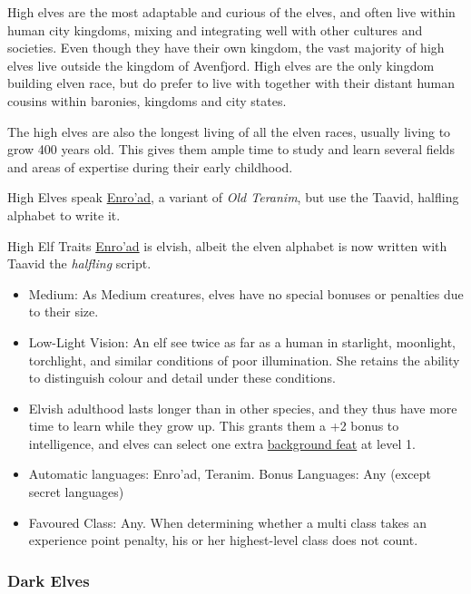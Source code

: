 High elves are the most adaptable and curious of the elves, and often live
within human city kingdoms, mixing and integrating well with other cultures
and societies. Even though they have their own kingdom, the vast majority of
high elves live outside the kingdom of Avenfjord. High elves are the only
kingdom building elven race, but do prefer to live with together with their
distant human cousins within baronies, kingdoms and city states.

The high elves are also the longest living of all the elven races, usually
living to grow 400 years old. This gives them ample time to study and learn
several fields and areas of expertise during their early childhood.

High Elves speak \hyperref[sec:Speak Language]{Enro'ad}, a variant of
\emph{Old Teranim}, but use the Taavid, halfling alphabet to write it.

\begin{35e}{High Elf Traits}
  \hyperref[sec:Speak Language]{Enro'ad} is elvish, albeit the elven alphabet
  is now written with Taavid the \emph{halfling} script.

  \begin{itemize}[noitemsep]
    \item Medium: As Medium creatures, elves have no special bonuses or
    penalties due to their size.
    \item Low-Light Vision: An elf see twice as far as a human in starlight,
    moonlight, torchlight, and similar conditions of poor illumination. She
    retains the ability to distinguish colour and detail under these
    conditions.
    \item Elvish adulthood lasts longer than in other species, and they thus
      have more time to learn while they grow up. This grants them a +2 bonus
      to intelligence, and elves can select one extra
      \hyperref[sec:Background Feats]{background feat} at level 1.
    \item Automatic languages: Enro'ad, Teranim. Bonus Languages: Any (except
      secret languages)
    \item Favoured Class: Any. When determining whether a multi class takes an
    experience point penalty, his or her highest-level class does not count.
  \end{itemize}
\end{35e}

\subsubsection{Dark Elves}
\label{sec:Dark Elves}

